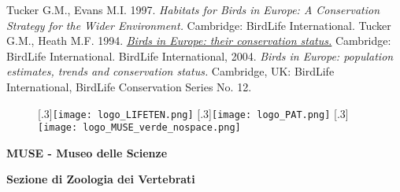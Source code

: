 \documentclass[10pt,twoside,openany,x11names,svgnames,italian,a5paper,dvipsnames,table]{memoir}
\begin{document}
\begin{thebibliography}{9}
Tucker G.M., Evans M.I. 1997. \emph{Habitats for Birds in Europe: A Conservation Strategy for the Wider Environment.} Cambridge: BirdLife International.
Tucker G.M., Heath M.F. 1994. \href{http://www.uam.es/personal_pdi/ciencias/jonate/Investigacion/CLI/CLI-1.pdf}{\emph{Birds in Europe: their conservation status.}} Cambridge: BirdLife International.
 BirdLife International, 2004. \emph{Birds in Europe: population estimates, trends and conservation status.} Cambridge, UK: BirdLife International, BirdLife Conservation Series No. 12.
\end{thebibliography}
\endgroup

\cleartoverso



\normalsize
\enlargethispage{3\baselineskip}
\thispagestyle{empty}
\pagecolor{Sienna!90!white}
\begin{center}
\vspace*{\fill}

\begin{figure}[htp]
\captionsetup{font=normalsize}
\centering
{}[.3\linewidth]{\texttt{[image: logo\_LIFETEN.png]}}
[.3\linewidth]{\texttt{[image: logo\_PAT.png]}}
[.3\linewidth]{\texttt{[image: logo\_MUSE\_verde\_nospace.png]}}
\end{figure}
\textbf{\textcolor{LightGoldenrod!50!Gold}{MUSE - Museo delle Scienze}}

\vspace*{\baselineskip}

\textbf{\textcolor{LightGoldenrod}{Sezione di Zoologia dei Vertebrati}}
\end{center}
\end{document}
